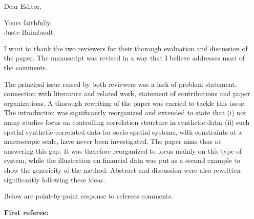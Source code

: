 \documentclass[11pt,a4paper,sans]{moderncv}        %
\begin{document}
\date{\today}
\opening{Dear Editor,}
\closing{Yours faithfully,\\
Juste Raimbault%
}

\makelettertitle



\justify





\bigskip

I want to thank the two reviewers for their thorough evaluation and discussion of the paper. %
The manuscript was revised in a way that I believe addresses most of the comments.

The principal issue raised by both reviewers was a lack of problem statement, connection with literature and related work, statement of contributions and paper organizations. A thorough rewriting of the paper was carried to tackle this issue. The introduction was significantly reorganized and extended to state that (i) not many studies focus on controlling correlation structure in synthetic data; (ii) such spatial synthetic correlated data for socio-spatial systems, with constraints at a macroscopic scale, have never been investigated. The paper aims thus at answering this gap. It was therefore reorganized to focus mainly on this type of system, while the illustration on financial data was put as a second example to show the genericity of the method. Abstract and discussion were also rewritten significantly following these ideas.


Below are point-by-point response to referees comments.

\bigskip


\textbf{First referee:}

\medskip

\end{document}

